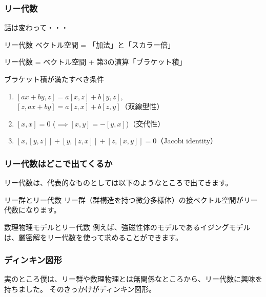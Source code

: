 \documentclass{beamer}
\begin{document}
\begin{frame}
    \frametitle{リー代数}

    話は変わって・・・

    \bigskip

    \begin{block}{リー代数}
        ベクトル空間 = 「加法」と「スカラー倍」

        リー代数 = ベクトル空間 + 第3の演算「ブラケット積」
    \end{block}

    ブラケット積が満たすべき条件
    \begin{enumerate}
        \item \([ax + by, z] = a[x, z] + b[y, z]\), \\
              \([z, ax + by] = a[z, x] + b[z, y]\)（双線型性）
        \item \([x, x] = 0\) (\(\implies [x, y] = - [y, x]\))（交代性）
        \item \([x, [y, z]] + [y, [z, x]] + [z, [x, y]] = 0\)（Jacobi identity）
    \end{enumerate}
\end{frame}

\begin{frame}
    \frametitle{リー代数はどこで出てくるか}

    リー代数は、代表的なものとしては以下のようなところで出てきます。

    \begin{block}{リー群とリー代数}
        リー群（群構造を持つ微分多様体）の接ベクトル空間がリー代数になります。
    \end{block}

    \begin{block}{数理物理モデルとリー代数}
        例えば、強磁性体のモデルであるイジングモデルは、厳密解をリー代数を使って求めることができます。
    \end{block}
\end{frame}

\begin{frame}
    \frametitle{ディンキン図形}

    実のところ僕は、リー群や数理物理とは無関係なところから、リー代数に興味を持ちました。
    そのきっかけがディンキン図形。

    \begin{example}[ディンキン図形]
    \end{example}
\end{frame}
\end{document}
